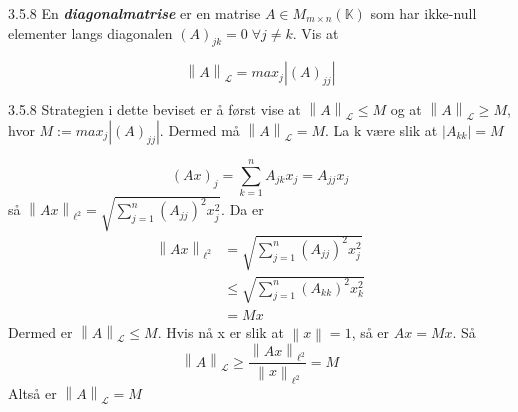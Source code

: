 \documentclass[a4paper,norsk]{article}
\renewcommand{\geq}{\geqslant}
\renewcommand{\leq}{\leqslant}
\begin{document}
\begin{oppgavebox}{3.5.8}{}
En \textbf{\textit{diagonalmatrise}} er en matrise $ A \in M_{m \times n} (\mathbb{K}) $ som har ikke-null elementer langs diagonalen $ \left( A \right) _{jk} = 0 \; \forall j\neq k $. Vis at

\[
    \left\lVert A \right\rVert _{\mathcal{L}} = max_j \left| \left( A \right) _{jj} \right| 
\]

\begin{proofbox}{3.5.8}{}
Strategien i dette beviset er å først vise at $ \left\lVert A \right\rVert _{\mathcal{L}} \leq M $ og at $ \left\lVert A \right\rVert _{\mathcal{L}} \geq M $, hvor $ M := max_j \left| \left( A \right) _{jj} \right|  $. Dermed må $ \left\lVert A \right\rVert _{\mathcal{L}} = M $. La k være slik at $ \left| A_{kk} \right| =M $ 

\[
    \left( Ax \right) _j = \sum_{ k=1 }^{ n } A_{jk} x_j = A_{jj} x_j
\]
så $ \left\lVert Ax \right\rVert _{\ell^2} = \sqrt{ 
    \sum_{ j=1 }^{ n } \left( A_{jj} \right) ^2 x_j^2
} $. Da er \begin{align*}
    \left\lVert Ax \right\rVert _{\ell^2} &= \sqrt{ \sum_{ j=1 }^{ n } \left( A_{jj} \right) ^2 x_j^2 }\\
    &\leq \sqrt{ \sum_{ j=1 }^{ n } \left( A_{kk} \right)^2 x_k^2  }\\
    &= Mx
\end{align*}
Dermed er $ \left\lVert A \right\rVert _{\mathcal{L}} \leq M $. Hvis nå x er slik at $ \left\lVert x \right\rVert =1 $, så er $ Ax = Mx $. Så 
\[
    \left\lVert A \right\rVert _{\mathcal{L}} \geq \frac{ \left\lVert Ax \right\rVert_{\ell^2}  }{ \left\lVert x \right\rVert _{\ell^2} } = M
\]
Altså er $ \left\lVert A \right\rVert _{\mathcal{L}} = M $ 
\end{proofbox}
\end{oppgavebox}
\end{document}
